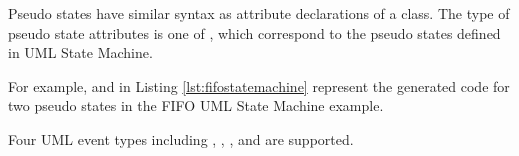 Pseudo states have similar syntax as attribute declarations of a class.
The type of pseudo state attributes is one of , which correspond to the pseudo states defined in UML State Machine. 
\begin{comment}
\begin{itemize}[\footnotesize]
	\item \ti{pseudo state} $\rightarrow$ \tf{'pseudo\_keyword' name} 
	
	
	
	
	
	
	
	
	
\end{itemize}
\end{comment}
For example,  and  in Listing \ref{lst:fifostatemachine} represent the generated code for two  pseudo states in the FIFO UML State Machine example.  

\vskip 0.2cm
\noindent
{}
Four UML event types including , , , and  are supported.

